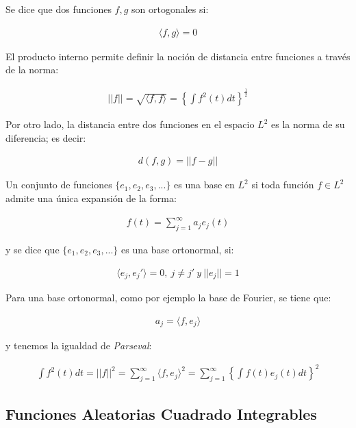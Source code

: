 \documentclass[
]{book}
\begin{document}
Se dice que dos funciones \(f,g\) son ortogonales si:

\begin{align*}
    \langle f,g \rangle=0
\end{align*}

El producto interno permite definir la noción de distancia entre funciones a través de la norma:

\begin{align*}
  ||f||=\sqrt{\langle f,f \rangle}=\left\{\int f^2 (t) dt \right\}^{\frac{1}{2}}
\end{align*}

Por otro lado, la distancia entre dos funciones en el espacio \(L^2\) es la norma de su diferencia; es decir:

\begin{align*}
    d(f,g)=||f-g||
\end{align*}

Un conjunto de funciones \(\{e_1,e_2,e_3,...\}\) es una base en \(L^2\) si toda función \(f\in L^2\) admite una única expansión de la forma:

\begin{align*}
    f(t)=\sum_{j=1}^\infty {a_je_j(t)}
\end{align*}

y se dice que \(\{e_1,e_2,e_3,...\}\) es una base ortonormal, si:

\begin{align*}
    \langle e_j,e_j' \rangle =0,\ j\neq j' \ y\ ||e_j||=1
\end{align*}

Para una base ortonormal, como por ejemplo la base de Fourier, se tiene que:

\begin{align*}
    a_j=\langle f,e_j \rangle
\end{align*}

y tenemos la igualdad de \emph{Parseval}:

\begin{align*}
    \int f^2 (t) dt = ||f||^2 = \sum_{j=1}^{\infty} {\langle f,e_j \rangle ^2} = \sum_{j=1}^{\infty} \left\{\int f(t)e_{j}(t) dt\right\}^2
\end{align*}

\hypertarget{funciones-aleatorias-cuadrado-integrables}{%
\subsection{\texorpdfstring{\textbf{Funciones Aleatorias Cuadrado Integrables}}{Funciones Aleatorias Cuadrado Integrables}}\label{funciones-aleatorias-cuadrado-integrables}}
\end{document}
